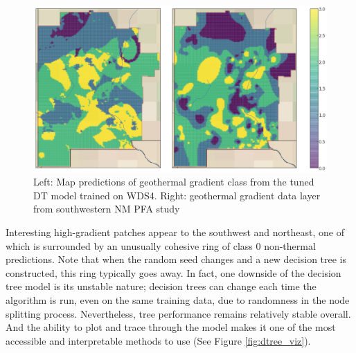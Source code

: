 \begin{figure}[!htp]
\centering
\includegraphics[width=\textwidth]{templates/images/Figure-DT-FinalMap_Joint.png}
\caption[Decision tree prediction map]{Left: Map predictions of geothermal gradient class from the tuned DT model trained on WDS4. Right: geothermal gradient data layer from southwestern NM PFA study \protect\citep{bielicki_hydrogeolgic_2015}}
\label{fig:dtree_final_map}
\end{figure}

Interesting high-gradient patches appear to the southwest and northeast, one of which is surrounded by an unusually cohesive ring of class 0 non-thermal predictions. Note that when the random seed changes and a new decision tree is constructed, this ring typically goes away. In fact, one downside of the decision tree model is its unstable nature; decision trees can change each time the algorithm is run, even on the same training data, due to randomness in the node splitting process. Nevertheless, tree performance remains relatively stable overall. And the ability to plot and trace through the model makes it one of the most accessible and interpretable methods to use (See Figure \ref{fig:dtree_viz}).

